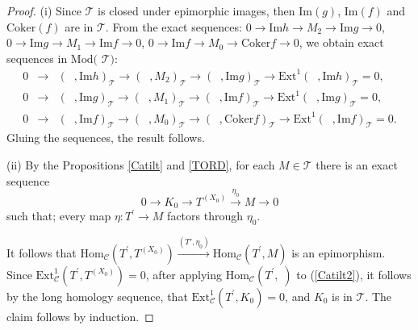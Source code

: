 \documentclass{amsart}
\theoremstyle{plain}
\numberwithin{equation}{section}
\begin{document}
\begin{proof}
(i) Since $\mathscr {T}$ is closed under epimorphic images, then $\mathrm{Im}(g)$, $\mathrm{Im}(f)$ and $\mathrm{Coker}(f)$ are in $\mathscr T$. From the
exact sequences: $0\rightarrow \mathrm{Im}h\rightarrow M_{2}\rightarrow
\mathrm{Im}g\rightarrow 0$, $0\rightarrow \mathrm{Im}g\rightarrow
M_{1}\rightarrow \mathrm{Im}f\rightarrow 0$, $0\rightarrow \mathrm{Im}f\rightarrow M_{0}\rightarrow \mathrm{Coker}f\rightarrow 0$, we obtain exact
sequences in $\mathrm{Mod}($ $\mathcal{T}):$
\begin{eqnarray*}
0 &\rightarrow &(\;\;,\mathrm{Im}h)_{\mathcal{T}}\rightarrow (\;\;,M_{2})_{\mathcal{T}}\rightarrow (\;\;,\mathrm{Im}g)_{\mathcal{T}}\rightarrow \mathrm{Ext}^{1}(\;\;,\mathrm{Im}h)_{\mathcal{T}}=0\text{,} \\
0 &\rightarrow &(\;\;,\mathrm{Im}g)_{\mathcal{T}}\rightarrow (\;\;,M_{1})_{\mathcal{T}}\rightarrow (\;\;,\mathrm{Im}f)_{\mathcal{T}}\rightarrow \mathrm{Ext}^{1}(\;\;,\mathrm{Im}g)_{\mathcal{T}}=0\text{,} \\
0 &\rightarrow &(\;\;,\mathrm{Im}f)_{\mathcal{T}}\rightarrow (\;\;,M_{0})_{\mathcal{T}}\rightarrow (\;\;,\mathrm{Coker}f)_{\mathcal{T}}\rightarrow
\mathrm{Ext}^{1}(\;\;,\mathrm{Im}f)_{\mathcal{T}}=0\text{.}
\end{eqnarray*}Gluing the sequences, the result follows.

(ii) By the Propositions \ref{Catilt} and \ref{TORD}, for each $M\in
\mathscr
T$ there is an exact sequence
\begin{equation}
0\rightarrow K_{0}\rightarrow T^{(X_{0})}\xrightarrow{\eta_0}M\rightarrow 0
\label{Catilt2}
\end{equation}such that; every map $\eta :T^{\prime }\rightarrow M$ factors through $\eta_0 $.

It follows that $\mathrm{Hom}_{\mathcal{C}}(T^{\prime },T^{(X_{0})})\xrightarrow{(T',\eta_0)}\mathrm{Hom}_{\mathcal{C}}(T^{\prime },M)$ is an
epimorphism. Since $\mathrm{Ext}^{1}_{\mathcal{C}}(T^{\prime
},T^{(X_{0})})=0 $, after applying $\mathrm{Hom}_{\mathcal{C}}(T^{\prime
},\;)$ to (\ref{Catilt2}), it follows by the long homology sequence, that $\mathrm{Ext}^{1}_{\mathcal{C}}(T^{\prime },K_{0})=0$, and $K_{0}$ is in $\mathscr{T}$. The claim follows by induction.


\end{proof}
\end{document}

